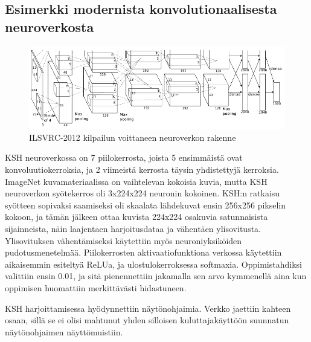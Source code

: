 \documentclass[finnish]{tktltiki2}
\theoremstyle{definition}
\theoremstyle{remark}
\begin{document}
  \subsection{Esimerkki modernista konvolutionaalisesta neuroverkosta}
    \begin{figure}[h]
      \centering
      \includegraphics[scale=0.4]{imagenet}
      \caption{ILSVRC-2012 kilpailun voittaneen neuroverkon rakenne \cite{KSHimagenet2012}}
      \label{pic:hsk-neuralnet}
    \end{figure}

    KSH neuroverkossa on 7 piilokerrosta, joista 5 ensimmäistä ovat konvoluutiokerroksia, ja 2 viimeistä kerrosta täysin yhdistettyjä kerroksia. ImageNet kuvamateriaalissa on vaihtelevan kokoisia kuvia, mutta KSH neuroverkon syötekerros oli 3x224x224 neuronin kokoinen. KSH:n ratkaisu syötteen sopivaksi saamiseksi oli skaalata lähdekuvat ensin 256x256 pikselin kokoon, ja tämän jälkeen ottaa kuvista 224x224 osakuvia satunnaisista sijainneista, näin laajentaen harjoitusdataa ja vähentäen ylisovitusta. Ylisovituksen vähentämiseksi käytettiin myös neuroniyksiköiden pudotusmenetelmää. Piilokerrosten aktivaatiofunktiona verkossa käytettiin aikaisemmin esiteltyä ReLUa, ja ulostulokerroksessa softmaxia. Oppimistahdiksi valittiin ensin 0.01, ja sitä pienennettiin jakamalla sen arvo kymmenellä aina kun oppimisen huomattiin merkittävästi hidastuneen. 
    
    KSH harjoittamisessa hyödynnettiin näytönohjaimia. Verkko jaettiin kahteen osaan, sillä se ei olisi mahtunut yhden silloisen kuluttajakäyttöön suunnatun näytönohjaimen näyttömuistiin.

\end{document}
